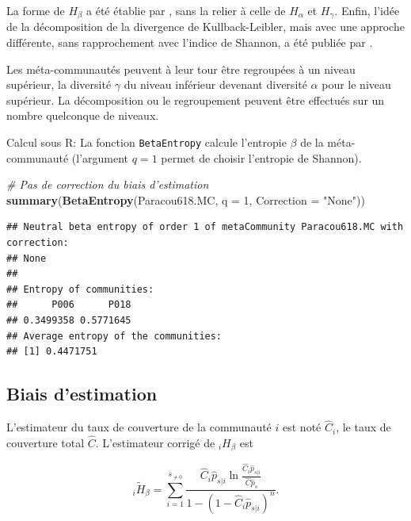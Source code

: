 \documentclass[
  11pt,
  french,
  a4paper,
  extrafontsizes,onecolumn,openright
  ]{memoir}
\newenvironment{Shaded}{\begin{snugshade}}{\end{snugshade}}
\newcommand{\CommentTok}[1]{\textcolor[rgb]{0.56,0.35,0.01}{\textit{#1}}}
\newcommand{\DataTypeTok}[1]{\textcolor[rgb]{0.13,0.29,0.53}{#1}}
\newcommand{\DecValTok}[1]{\textcolor[rgb]{0.00,0.00,0.81}{#1}}
\newcommand{\KeywordTok}[1]{\textcolor[rgb]{0.13,0.29,0.53}{\textbf{#1}}}
\newcommand{\NormalTok}[1]{#1}
\newcommand{\StringTok}[1]{\textcolor[rgb]{0.31,0.60,0.02}{#1}}
\begin{document}
La forme de \(H_{\beta}\) a été établie par \textcite{Ricotta2003a}, sans la relier à celle de \(H_{\alpha}\) et \(H_{\gamma}\).
Enfin, l'idée de la décomposition de la divergence de Kullback-Leibler, mais avec une approche différente, sans rapprochement avec l'indice de Shannon, a été publiée par \textcite{Ludovisi2006}.

Les méta-communautés peuvent à leur tour être regroupées à un niveau supérieur, la diversité \(\gamma\) du niveau inférieur devenant diversité \(\alpha\) pour le niveau supérieur.
La décomposition ou le regroupement peuvent être effectués sur un nombre quelconque de niveaux.

Calcul sous R: La fonction \texttt{BetaEntropy} calcule l'entropie \(\beta\) de la méta-communauté (l'argument \(q=1\) permet de choisir l'entropie de Shannon).

\scriptsize

\begin{Shaded}
\begin{Highlighting}[]
\CommentTok{# Pas de correction du biais d'estimation}
\KeywordTok{summary}\NormalTok{(}\KeywordTok{BetaEntropy}\NormalTok{(Paracou618.MC, }\DataTypeTok{q =} \DecValTok{1}\NormalTok{, }\DataTypeTok{Correction =} \StringTok{"None"}\NormalTok{))}
\end{Highlighting}
\end{Shaded}

\begin{verbatim}
## Neutral beta entropy of order 1 of metaCommunity Paracou618.MC with correction: 
## None 
## 
## Entropy of communities: 
##      P006      P018 
## 0.3499358 0.5771645 
## Average entropy of the communities: 
## [1] 0.4471751
\end{verbatim}

\normalsize

\hypertarget{sec:BiaisShannonBeta}{%
\subsection{Biais d'estimation}\label{sec:BiaisShannonBeta}}

L'estimateur du taux de couverture de la communauté \(i\) est noté \(\hat{C}_i\), le taux de couverture total \(\hat{C}\).
L'estimateur corrigé de \(_iH_{\beta}\) est

\begin{equation}
  \label{eq:EstHbetai}
  _{i}\tilde{H}_{\beta} = \sum^{s_{\ne 0}}_{i=1}{\frac{{\hat{C}}_i{\hat{p}}_{s|i} \ln\frac{{\hat{C}}_i{\hat{p}}_{s|i}}{\hat{C}{\hat{p}}_s}}{1-{\left(1-{\hat{C}}_i{\hat{p}}_{s|i}\right)}^n}}.
\end{equation}
\end{document}
